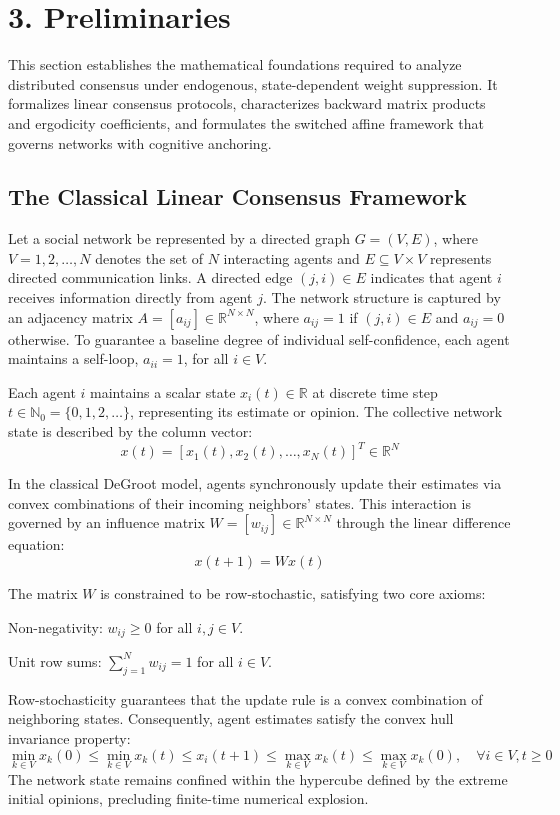 \section{3. Preliminaries}
This section establishes the mathematical foundations required to analyze distributed consensus under endogenous, state-dependent weight suppression. It formalizes linear consensus protocols, characterizes backward matrix products and ergodicity coefficients, and formulates the switched affine framework that governs networks with cognitive anchoring.

\subsection{The Classical Linear Consensus Framework}
Let a social network be represented by a directed graph $G = (V, E)$, where $V = {1, 2, \dots, N}$ denotes the set of $N$ interacting agents and $E \subseteq V \times V$ represents directed communication links. A directed edge $(j, i) \in E$ indicates that agent $i$ receives information directly from agent $j$. The network structure is captured by an adjacency matrix $A = [a_{ij}] \in \mathbb{R}^{N \times N}$, where $a_{ij} = 1$ if $(j, i) \in E$ and $a_{ij} = 0$ otherwise. To guarantee a baseline degree of individual self-confidence, each agent maintains a self-loop, $a_{ii} = 1$, for all $i \in V$.

Each agent $i$ maintains a scalar state $x_i(t) \in \mathbb{R}$ at discrete time step $t \in \mathbb{N}_0 = \{0,1,2,\ldots\}$, representing its estimate or opinion. The collective network state is described by the column vector: $$x(t) = [x_1(t), x_2(t), \dots, x_N(t)]^T \in \mathbb{R}^N$$

In the classical DeGroot model, agents synchronously update their estimates via convex combinations of their incoming neighbors' states\cite{degroot1974reaching}. This interaction is governed by an influence matrix $W = [w_{ij}] \in \mathbb{R}^{N \times N}$ through the linear difference equation: $$x(t+1) = W x(t)$$

The matrix $W$ is constrained to be row-stochastic, satisfying two core axioms\cite{degroot1974reaching}:

Non-negativity: $w_{ij} \ge 0$ for all $i, j \in V$\cite{degroot1974reaching}.

Unit row sums: $\sum_{j=1}^N w_{ij} = 1$ for all $i \in V$\cite{degroot1974reaching}.

Row-stochasticity guarantees that the update rule is a convex combination of neighboring states\cite{degroot1974reaching}. Consequently, agent estimates satisfy the convex hull invariance property\cite{degroot1974reaching}: $$\min_{k \in V} x_k(0) \le \min_{k \in V} x_k(t) \le x_i(t+1) \le \max_{k \in V} x_k(t) \le \max_{k \in V} x_k(0), \quad \forall i \in V, t \ge 0$$ The network state remains confined within the hypercube defined by the extreme initial opinions, precluding finite-time numerical explosion\cite{degroot1974reaching}.


